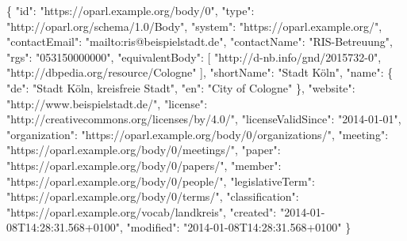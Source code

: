 \documentclass[,a4paper]{article}
\newenvironment{Shaded}{}{}
\newcommand{\DataTypeTok}[1]{\textcolor[rgb]{0.56,0.13,0.00}{{#1}}}
\newcommand{\StringTok}[1]{\textcolor[rgb]{0.25,0.44,0.63}{{#1}}}
\newcommand{\OtherTok}[1]{\textcolor[rgb]{0.00,0.44,0.13}{{#1}}}
\newcommand{\FunctionTok}[1]{\textcolor[rgb]{0.02,0.16,0.49}{{#1}}}
\begin{document}
\begin{Shaded}
\begin{Highlighting}[]
\FunctionTok{\{}
    \DataTypeTok{"id"}\FunctionTok{:} \StringTok{"https://oparl.example.org/body/0"}\FunctionTok{,}
    \DataTypeTok{"type"}\FunctionTok{:} \StringTok{"http://oparl.org/schema/1.0/Body"}\FunctionTok{,}
    \DataTypeTok{"system"}\FunctionTok{:} \StringTok{"https://oparl.example.org/"}\FunctionTok{,}
    \DataTypeTok{"contactEmail"}\FunctionTok{:} \StringTok{"mailto:ris@beispielstadt.de"}\FunctionTok{,}
    \DataTypeTok{"contactName"}\FunctionTok{:} \StringTok{"RIS-Betreuung"}\FunctionTok{,}
    \DataTypeTok{"rgs"}\FunctionTok{:} \StringTok{"053150000000"}\FunctionTok{,}
    \DataTypeTok{"equivalentBody"}\FunctionTok{:} \OtherTok{[}
        \StringTok{"http://d-nb.info/gnd/2015732-0"}\OtherTok{,}
        \StringTok{"http://dbpedia.org/resource/Cologne"}
    \OtherTok{]}\FunctionTok{,}
    \DataTypeTok{"shortName"}\FunctionTok{:} \StringTok{"Stadt Köln"}\FunctionTok{,}
    \DataTypeTok{"name"}\FunctionTok{:} \FunctionTok{\{}
        \DataTypeTok{"de"}\FunctionTok{:} \StringTok{"Stadt Köln, kreisfreie Stadt"}\FunctionTok{,}
        \DataTypeTok{"en"}\FunctionTok{:} \StringTok{"City of Cologne"}
    \FunctionTok{\},}
    \DataTypeTok{"website"}\FunctionTok{:} \StringTok{"http://www.beispielstadt.de/"}\FunctionTok{,}
    \DataTypeTok{"license"}\FunctionTok{:} \StringTok{"http://creativecommons.org/licenses/by/4.0/"}\FunctionTok{,}
    \DataTypeTok{"licenseValidSince"}\FunctionTok{:} \StringTok{"2014-01-01"}\FunctionTok{,}
    \DataTypeTok{"organization"}\FunctionTok{:} \StringTok{"https://oparl.example.org/body/0/organizations/"}\FunctionTok{,}
    \DataTypeTok{"meeting"}\FunctionTok{:} \StringTok{"https://oparl.example.org/body/0/meetings/"}\FunctionTok{,}
    \DataTypeTok{"paper"}\FunctionTok{:} \StringTok{"https://oparl.example.org/body/0/papers/"}\FunctionTok{,}
    \DataTypeTok{"member"}\FunctionTok{:} \StringTok{"https://oparl.example.org/body/0/people/"}\FunctionTok{,}
    \DataTypeTok{"legislativeTerm"}\FunctionTok{:} \StringTok{"https://oparl.example.org/body/0/terms/"}\FunctionTok{,}
    \DataTypeTok{"classification"}\FunctionTok{:} \StringTok{"https://oparl.example.org/vocab/landkreis"}\FunctionTok{,}
    \DataTypeTok{"created"}\FunctionTok{:} \StringTok{"2014-01-08T14:28:31.568+0100"}\FunctionTok{,}
    \DataTypeTok{"modified"}\FunctionTok{:} \StringTok{"2014-01-08T14:28:31.568+0100"}
\FunctionTok{\}}
\end{Highlighting}
\end{Shaded}
\end{document}
